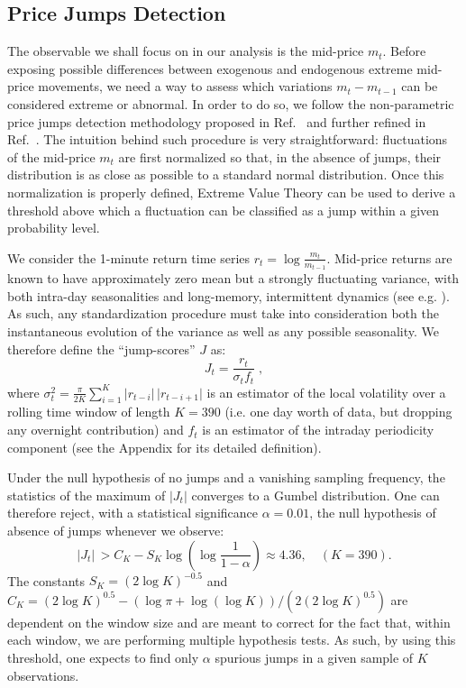 \documentclass[amsmath,amssymb,aps,pre,floatfix,twocolumn,superscriptaddress]{revtex4}
\begin{document}
\subsection{Price Jumps Detection}

The observable we shall focus on in our analysis is the mid-price $m_t$. Before exposing possible differences between exogenous and endogenous extreme mid-price movements, we need a way to assess which variations $m_{t}-m_{t-1}$ can be considered extreme or abnormal. In order to do so, we follow the non-parametric price jumps detection methodology proposed in Ref.~\cite{jump_test_1} and further refined in Ref.~\cite{jump_test_2}. The intuition behind such procedure is very straightforward: fluctuations of the mid-price $m_t$ are first normalized so that, in the absence of jumps, their distribution is as close as possible to a standard normal distribution. Once this normalization is properly defined, Extreme Value Theory can be used to derive a threshold above which a fluctuation can be classified as a jump within a given probability level. 

We consider the 1-minute return time series $r_t = \log{\frac{m_t}{m_{t-1}}}$. Mid-price returns are known to have approximately zero mean but a strongly fluctuating variance, with both intra-day seasonalities and long-memory, intermittent dynamics (see e.g. \cite{cont_empirical, MRW, rough_vol_long_range, hardiman2013critical, quadratic_hawkes}). As such, any standardization procedure must take into consideration both the instantaneous evolution of the variance as well as any possible seasonality. We therefore define the ``jump-scores'' $J$ as:
\begin{equation}\label{eq: J stat}
    J_t = \frac{r_t}{\sigma_t f_t} \; ,
\end{equation}
where $\sigma^2_t = \frac{\pi}{2 K} \sum_{i=1}^{K} \vert r_{t-i} \vert\, \vert r_{t-i+1}\vert$ is an estimator of the local volatility over a rolling time window of length $K=390$ (i.e. one day worth of data, but dropping any overnight contribution) and $f_t$ is an estimator of the intraday periodicity component (see the Appendix for its detailed definition). 

Under the null hypothesis of no jumps and a vanishing sampling frequency, the statistics of the maximum of $\vert J_t \vert$ converges to a Gumbel distribution. One can therefore reject, with a statistical significance $\alpha=0.01$, the null hypothesis of absence of jumps whenever we observe:
\begin{equation*}%
\vert J_t \vert\, > C_{K} - S_{K} \log{ (\log{\frac{1}{1 - \alpha}} ) }
\approx 4.36, \quad (K=390).
\end{equation*}
The constants $S_K =(2 \log K )^{-0.5}$ and $C_K = (2 \log K )^{0.5} - (\log \pi + \log(\log K))/(2 (2 \log K )^{0.5}) $ are dependent on the window size and are meant to correct for the fact that, within each window, we are performing multiple hypothesis tests. As such, by using this threshold, one expects to find only $\alpha$ spurious jumps in a given sample of $K$ observations.
\end{document}
